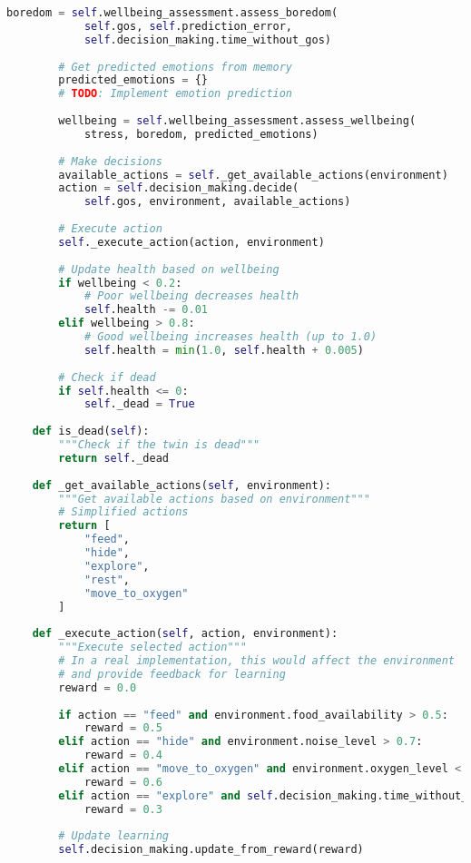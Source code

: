 \documentclass[11pt,a4paper]{article}
\begin{document}
\begin{lstlisting}[language=Python]
        boredom = self.wellbeing_assessment.assess_boredom(
            self.gos, self.prediction_error, 
            self.decision_making.time_without_gos)
            
        # Get predicted emotions from memory
        predicted_emotions = {}
        # TODO: Implement emotion prediction
        
        wellbeing = self.wellbeing_assessment.assess_wellbeing(
            stress, boredom, predicted_emotions)
            
        # Make decisions
        available_actions = self._get_available_actions(environment)
        action = self.decision_making.decide(
            self.gos, environment, available_actions)
            
        # Execute action
        self._execute_action(action, environment)
        
        # Update health based on wellbeing
        if wellbeing < 0.2:
            # Poor wellbeing decreases health
            self.health -= 0.01
        elif wellbeing > 0.8:
            # Good wellbeing increases health (up to 1.0)
            self.health = min(1.0, self.health + 0.005)
            
        # Check if dead
        if self.health <= 0:
            self._dead = True
            
    def is_dead(self):
        """Check if the twin is dead"""
        return self._dead
        
    def _get_available_actions(self, environment):
        """Get available actions based on environment"""
        # Simplified actions
        return [
            "feed",
            "hide",
            "explore",
            "rest",
            "move_to_oxygen"
        ]
        
    def _execute_action(self, action, environment):
        """Execute selected action"""
        # In a real implementation, this would affect the environment
        # and provide feedback for learning
        reward = 0.0
        
        if action == "feed" and environment.food_availability > 0.5:
            reward = 0.5
        elif action == "hide" and environment.noise_level > 0.7:
            reward = 0.4
        elif action == "move_to_oxygen" and environment.oxygen_level < 6.0:
            reward = 0.6
        elif action == "explore" and self.decision_making.time_without_gos > 50:
            reward = 0.3
            
        # Update learning
        self.decision_making.update_from_reward(reward)
        

\end{lstlisting}
\end{document}
